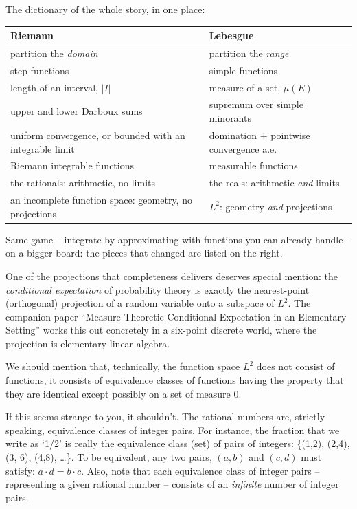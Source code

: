 \documentclass{article}
\begin{document}
The dictionary of the whole story, in one place:

\begin{center}
\begin{tabular}{l|l}
{\bf Riemann} & {\bf Lebesgue} \\
\hline
partition the {\em domain} & partition the {\em range} \\
step functions & simple functions \\
length of an interval, $|I|$ & measure of a set, $\mu(E)$ \\
upper and lower Darboux sums & supremum over simple minorants \\
uniform convergence, or bounded with an integrable limit & domination $+$ pointwise convergence a.e. \\
Riemann integrable functions & measurable functions \\
the rationals: arithmetic, no limits & the reals: arithmetic {\em and} limits \\
an incomplete function space: geometry, no projections & $L^2$: geometry {\em and} projections \\
\end{tabular}
\end{center}

Same game -- integrate by approximating with functions you can already
handle -- on a bigger board: the pieces that changed are listed on the
right.

One of the projections that completeness delivers deserves special mention:
the {\em conditional expectation\/} of probability theory is exactly the
nearest-point (orthogonal) projection of a random variable onto a subspace
of $L^2$. The companion paper ``Measure Theoretic Conditional Expectation
in an Elementary Setting'' works this out concretely in a six-point
discrete world, where the projection is elementary linear algebra.

We should mention that, technically, the function space $L^2$ does not 
consist of functions, it consists of 
equivalence classes of functions having the property
that they are identical except possibly on a set of measure $0$.

If this seems strange to you, it shouldn't. The rational numbers are, strictly 
speaking, equivalence classes of integer pairs.
For instance, the fraction that we write as `1/2' is really the 
equivalence class (set) of pairs of integers: 
\{(1,2), (2,4), (3, 6), (4,8), \ldots \}.
To be equivalent, any two pairs, $(a, b)$ and $(c, d)$ must satisfy: 
$a \cdot d = b \cdot c$. Also, note that each equivalence class of integer pairs --
representing a given rational number -- consists of an {\em infinite\/} number 
of integer pairs.
\end{document}
